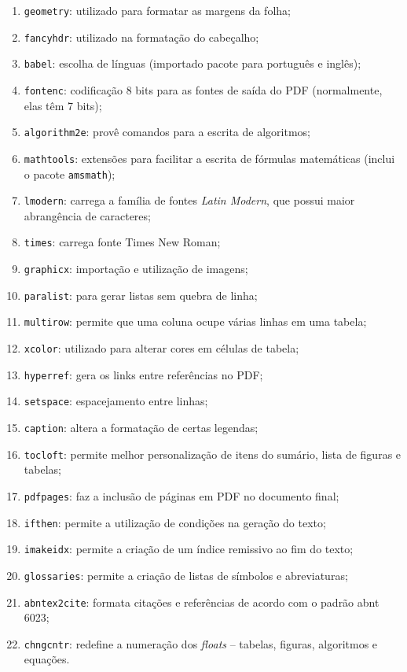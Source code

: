 \documentclass[xindy,draft]{fei}
\begin{document}
    \begin{enumerate}
        \item\texttt{geometry}: utilizado para formatar as margens da folha;
        \item\texttt{fancyhdr}: utilizado na formatação do cabeçalho;
        \item\texttt{babel}: escolha de línguas (importado pacote para português e inglês);
        \item\texttt{fontenc}: codificação 8 bits para as fontes de saída do PDF (normalmente, elas têm 7 bits);
        \item\texttt{algorithm2e}: provê comandos para a escrita de algoritmos;
        \item\texttt{mathtools}: extensões para facilitar a escrita de fórmulas matemáticas (inclui o pacote \texttt{amsmath});
        \item\texttt{lmodern}: carrega a família de fontes \emph{Latin Modern}, que possui maior abrangência de caracteres;
        \item\texttt{times}: carrega fonte Times New Roman;
        \item\texttt{graphicx}: importação e utilização de imagens;
        \item\texttt{paralist}: para gerar listas sem quebra de linha;
        \item\texttt{multirow}: permite que uma coluna ocupe várias linhas em uma tabela;
        \item\texttt{xcolor}: utilizado para alterar cores em células de tabela;
        \item\texttt{hyperref}: gera os links entre referências no PDF;
        \item\texttt{setspace}: espacejamento entre linhas;
        \item\texttt{caption}: altera a formatação de certas legendas;
        \item\texttt{tocloft}: permite melhor personalização de itens do sumário, lista de figuras e tabelas;
        \item\texttt{pdfpages}: faz a inclusão de páginas em PDF no documento final;
        \item\texttt{ifthen}: permite a utilização de condições na geração do texto;
        \item\texttt{imakeidx}: permite a criação de um índice remissivo ao fim do texto;
        \item{}\texttt{glossaries}: permite a criação de listas de símbolos e abreviaturas;
        \item\texttt{abntex2cite}: formata citações e referências de acordo com o padrão \gls{abnt} 6023;
        \item\texttt{chngcntr}: redefine a numeração dos \emph{floats} -- tabelas, figuras, algoritmos e equações.
    \end{enumerate}
\end{document}

